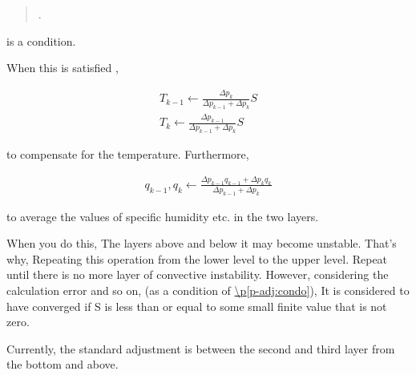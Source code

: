 \begin{quote}
\protect\hypertarget{p-adj:cond}{}{ }.
\end{quote}

is a condition.

When this is satisfied ,

\begin{eqnarray}
T_{k-1}  \leftarrow  \frac{\Delta p_{k}}{\Delta p_{k-1} + \Delta p_{k}} S \\
T_{k}  \leftarrow  \frac{\Delta p_{k-1}}{\Delta p_{k-1} + \Delta p_{k}} S 
\end{eqnarray}

to compensate for the temperature. Furthermore,

\begin{eqnarray}
q_{k-1}, q_{k} \leftarrow
     \frac{\Delta p_{k-1} q_{k-1} + \Delta p_{k} q_{k}}
          {\Delta p_{k-1} + \Delta p_{k}} 
\end{eqnarray}

to average the values of specific humidity etc. in the two layers.

When you do this, The layers above and below it may become unstable.
That's why, Repeating this operation from the lower level to the upper
level. Repeat until there is no more layer of convective instability.
However, considering the calculation error and so on, (as a condition of
\protect\hyperlink{p-adj:condo}{\textbackslash p{[}p-adj:condo{]}}), It
is considered to have converged if S is less than or equal to some small
finite value that is not zero.

Currently, the standard adjustment is between the second and third layer
from the bottom and above.
